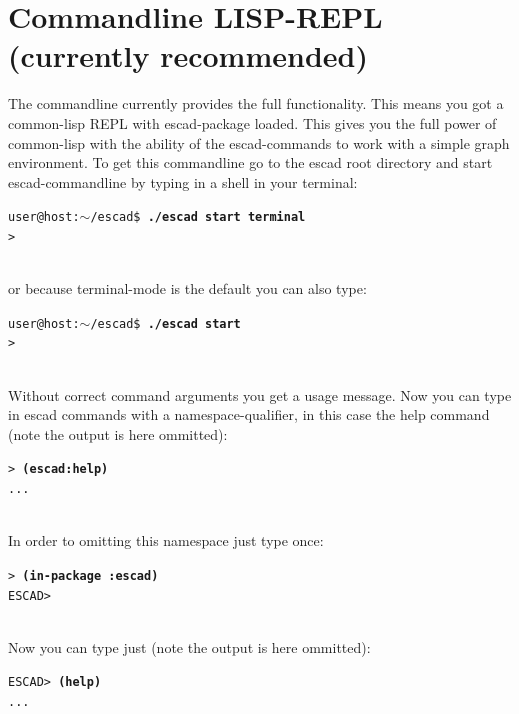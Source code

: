 \documentclass[a4paper, 12pt, openany]{scrbook}
\makeatletter
\newcommand{\shellcmdline}[2]{\\
  \setlength{\fboxsep}{2pt}\colorbox{black!20}{\parbox{\textwidth}{\texttt{user@host:$\sim$/escad\$ \textbf{#1}\\#2}}}\\}
\newcommand{\escadcmdline}[2]{\\\setlength{\fboxsep}{2pt}\colorbox{black!20}{\parbox{\textwidth}{\texttt{ESCAD> \textbf{#1}\\#2}}}\\}
\newcommand{\lispcmdline}[2]{\\\setlength{\fboxsep}{2pt}\colorbox{black!20}{\parbox{\textwidth}{\texttt{> \textbf{#1}\\#2}}}\\}
\makeatother
\begin{document}
\section{Commandline LISP-REPL (currently recommended)}\label{sec:cmd_line}
The commandline currently provides the full functionality. This means you got a common-lisp REPL with escad-package loaded. This gives you the full power of common-lisp with the ability of the escad-commands to work with a simple graph environment. To get this commandline go to the escad root directory and start escad-commandline by typing in a shell in your terminal:
\shellcmdline{./escad start terminal}{>}
or because terminal-mode is the default you can also type:
\shellcmdline{./escad start}{>}
Without correct command arguments you get a usage message.
Now you can type in escad commands with a namespace-qualifier, in this case the help command (note the output is here ommitted):
\lispcmdline{(escad:help)}{...}
In order to omitting this namespace just type once:
\lispcmdline{(in-package :escad)}{ESCAD>}
Now you can type just (note the output is here ommitted):
\escadcmdline{(help)}{...}
\end{document}
